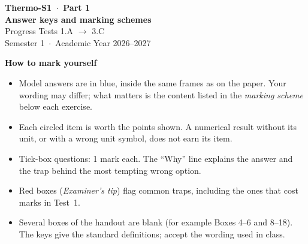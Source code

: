 \documentclass{ibetest}
\begin{document}
\testheader
\vspace{14mm}
\begin{center}
  {\sffamily\bfseries\Huge Thermo-S1 \,$\cdot$\, Part 1}\\[6pt]
  {\sffamily\bfseries\LARGE Answer keys and marking schemes}\\[8pt]
  {\large Progress Tests 1.A $\to$ 3.C}\\[3pt]
  {\normalsize Semester 1 \,$\cdot$\, Academic Year 2026--2027}
\end{center}
\vspace{9mm}

{\sffamily\bfseries How to mark yourself}
\begin{itemize}[leftmargin=7mm, itemsep=3pt]
  \item Model answers are in \textcolor{keyblue}{blue}, inside the same frames as on the
        paper. Your wording may differ; what matters is the content listed in the
        \emph{marking scheme} below each exercise.
  \item Each circled item is worth the points shown. A numerical result without its unit,
        or with a wrong unit symbol, does not earn its item.
  \item Tick-box questions: 1 mark each. The ``Why'' line explains the answer and the trap
        behind the most tempting wrong option.
  \item Red boxes (\emph{Examiner's tip}) flag common traps, including the ones that cost
        marks in Test~1.
  \item Several boxes of the handout are blank (for example Boxes 4--6 and 8--18). The keys
        give the standard definitions; accept the wording used in class.
\end{itemize}
\end{document}
